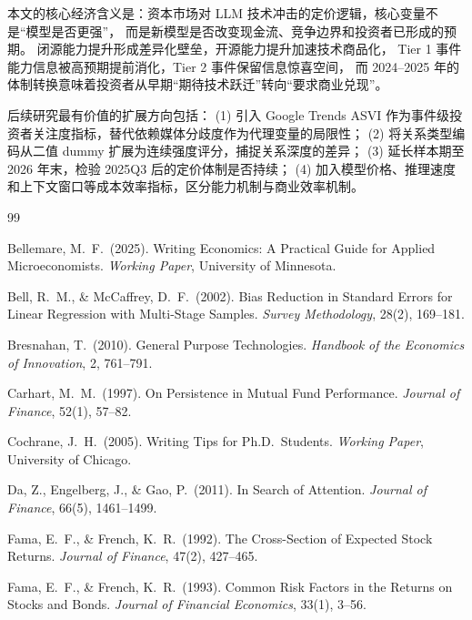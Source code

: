 \documentclass[11pt,fontset=fandol,a4paper]{ctexart}
\begin{document}
本文的核心经济含义是：资本市场对 LLM 技术冲击的定价逻辑，核心变量不是``模型是否更强''，
而是新模型是否改变现金流、竞争边界和投资者已形成的预期。
闭源能力提升形成差异化壁垒，开源能力提升加速技术商品化，
Tier 1 事件能力信息被高预期提前消化，Tier 2 事件保留信息惊喜空间，
而 2024--2025 年的体制转换意味着投资者从早期``期待技术跃迁''转向``要求商业兑现''。

后续研究最有价值的扩展方向包括：
(1) 引入 Google Trends ASVI 作为事件级投资者关注度指标，替代依赖媒体分歧度作为代理变量的局限性；
(2) 将关系类型编码从二值 dummy 扩展为连续强度评分，捕捉关系深度的差异；
(3) 延长样本期至 2026 年末，检验 2025Q3 后的定价体制是否持续；
(4) 加入模型价格、推理速度和上下文窗口等成本效率指标，区分能力机制与商业效率机制。

\begin{thebibliography}{99}
\small

Bellemare, M.\ F.\ (2025). Writing Economics: A Practical Guide for Applied Microeconomists. \emph{Working Paper}, University of Minnesota.

Bell, R.\ M., \& McCaffrey, D.\ F.\ (2002). Bias Reduction in Standard Errors for Linear Regression with Multi-Stage Samples. \emph{Survey Methodology}, 28(2), 169--181.

Bresnahan, T.\ (2010). General Purpose Technologies. \emph{Handbook of the Economics of Innovation}, 2, 761--791.

Carhart, M.\ M.\ (1997). On Persistence in Mutual Fund Performance. \emph{Journal of Finance}, 52(1), 57--82.

Cochrane, J.\ H.\ (2005). Writing Tips for Ph.D.\ Students. \emph{Working Paper}, University of Chicago.

Da, Z., Engelberg, J., \& Gao, P.\ (2011). In Search of Attention. \emph{Journal of Finance}, 66(5), 1461--1499.

Fama, E.\ F., \& French, K.\ R.\ (1992). The Cross-Section of Expected Stock Returns. \emph{Journal of Finance}, 47(2), 427--465.

Fama, E.\ F., \& French, K.\ R.\ (1993). Common Risk Factors in the Returns on Stocks and Bonds. \emph{Journal of Financial Economics}, 33(1), 3--56.


\end{thebibliography}
\end{document}
